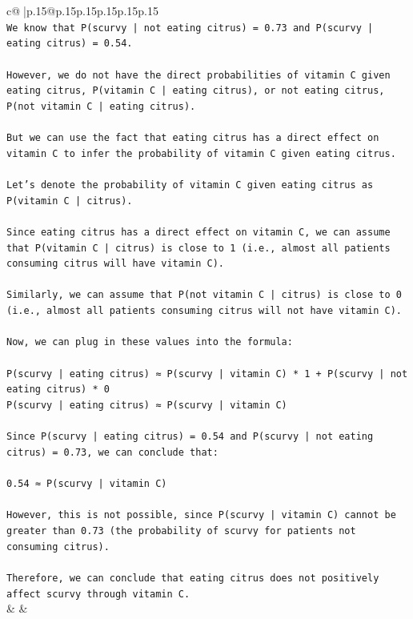 \documentclass{article}
\begin{document}
{\begin{supertabular}{c@{$\;$}|p{.15\linewidth}@{}p{.15\linewidth}p{.15\linewidth}p{.15\linewidth}p{.15\linewidth}p{.15\linewidth}}
{{{\\ 
\texttt{We know that P(scurvy | not eating citrus) = 0.73 and P(scurvy | eating citrus) = 0.54. } \\
\\ 
\texttt{However, we do not have the direct probabilities of vitamin C given eating citrus, P(vitamin C | eating citrus), or not eating citrus, P(not vitamin C | eating citrus). } \\
\\ 
\texttt{But we can use the fact that eating citrus has a direct effect on vitamin C to infer the probability of vitamin C given eating citrus. } \\
\\ 
\texttt{Let's denote the probability of vitamin C given eating citrus as P(vitamin C | citrus). } \\
\\ 
\texttt{Since eating citrus has a direct effect on vitamin C, we can assume that P(vitamin C | citrus) is close to 1 (i.e., almost all patients consuming citrus will have vitamin C). } \\
\\ 
\texttt{Similarly, we can assume that P(not vitamin C | citrus) is close to 0 (i.e., almost all patients consuming citrus will not have vitamin C).} \\
\\ 
\texttt{Now, we can plug in these values into the formula:} \\
\\ 
\texttt{P(scurvy | eating citrus) ≈ P(scurvy | vitamin C) * 1 + P(scurvy | not eating citrus) * 0} \\
\texttt{P(scurvy | eating citrus) ≈ P(scurvy | vitamin C)} \\
\\ 
\texttt{Since P(scurvy | eating citrus) = 0.54 and P(scurvy | not eating citrus) = 0.73, we can conclude that:} \\
\\ 
\texttt{0.54 ≈ P(scurvy | vitamin C)} \\
\\ 
\texttt{However, this is not possible, since P(scurvy | vitamin C) cannot be greater than 0.73 (the probability of scurvy for patients not consuming citrus). } \\
\\ 
\texttt{Therefore, we can conclude that eating citrus does not positively affect scurvy through vitamin C.} \\
            }
        }
    }
    & & \\ \\


\end{supertabular}}
\end{document}

